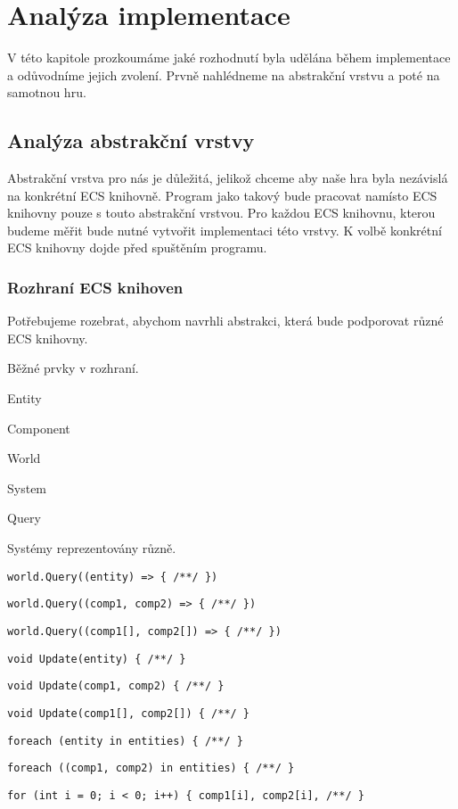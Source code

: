 \chapter{Analýza implementace}
V této kapitole prozkoumáme jaké rozhodnutí byla udělána během implementace a odůvodníme jejich zvolení. Prvně nahlédneme na abstrakční vrstvu a poté na samotnou hru.

\section{Analýza abstrakční vrstvy}
Abstrakční vrstva pro nás je důležitá, jelikož chceme aby naše hra byla nezávislá na konkrétní ECS knihovně. Program jako takový bude pracovat namísto ECS knihovny pouze s touto abstrakční vrstvou. Pro každou ECS knihovnu, kterou budeme měřit bude nutné vytvořit implementaci této vrstvy. K volbě konkrétní ECS knihovny dojde před spuštěním programu.

\subsection{Rozhraní ECS knihoven}
Potřebujeme rozebrat, abychom navrhli abstrakci, která bude podporovat různé ECS knihovny.

Běžné prvky v rozhraní.

\begin{ordering}
    \item Entity
    \item Component
    \item World
    \item System
    \item Query
\end{ordering}

Systémy reprezentovány různě.

\begin{ordering}
    \item \verb|world.Query((entity) => { /**/ })|
    \item \verb|world.Query((comp1, comp2) => { /**/ })|
    \item \verb|world.Query((comp1[], comp2[]) => { /**/ })|
    \item \verb|void Update(entity) { /**/ }|
    \item \verb|void Update(comp1, comp2) { /**/ }|
    \item \verb|void Update(comp1[], comp2[]) { /**/ }|
    \item \verb|foreach (entity in entities) { /**/ }|
    \item \verb|foreach ((comp1, comp2) in entities) { /**/ }|
    \item \verb|for (int i = 0; i < 0; i++) { comp1[i], comp2[i], /**/ }|
\end{ordering}

